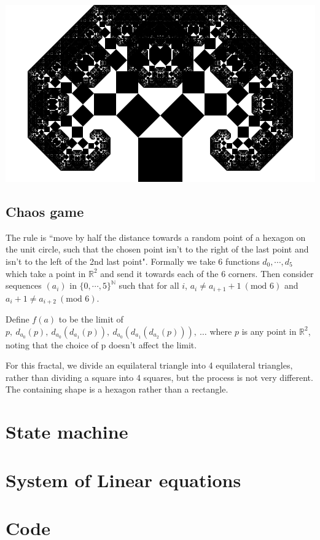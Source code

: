 \documentclass{article}
\newcommand{\bounding}{
\draw[tsty] (-2.5,1) -- (-1.5,0) -- (2.5,0) -- (3.5,1) -- (3.5,2.5) -- (2,4) -- (-1,4) -- (-2.5, 2.5) -- cycle;
}
\newcommand{\subt}[2]{
    \begin{scope}[yshift=1cm,rotate=45,scale=0.7071]
        #1
    \end{scope}
    \begin{scope}[xshift=0.5cm,yshift=1.5cm,rotate=-45,scale=0.7071]
        #2
    \end{scope}
}
\newcommand{\dup}[1]{\subt{#1}{#1}}
\newcommand{\gtree}[3]{
	#2
	\ifthenelse{#1<2}{
		#3
	}{
		\dup{\gtree{\the\numexpr#1-1}{#2}{#3}}
	}
}
\newcommand{\tree}[1]{
	\gtree{#1}{\fill[tsty] (0,0) -- (1,0) -- (1,1) -- (0,1) -- cycle;}{}
}
\newcommand{\outertree}[1]{
	\gtree{#1}{
		\fill[tsty] (0,0) -- (1,0) -- (1,1) -- (0,1) -- cycle;
	}{\bounding}
}
\newcommand{\depth}{5}%
\begin{document}
\includegraphics[width=\linewidth]{x7.png}

\label{sec:chaos}
\subsection{Chaos game}

The rule is ``move by half the distance towards a random point of a hexagon on the unit circle, such that the chosen point isn't to the right of the last point and isn't to the left of the 2nd last point". Formally we take 6 functions $d_0,\cdots, d_5$ which take a point in $\mathbb{R}^2$ and send it towards each of the 6 corners. Then consider sequences $(a_i)$ in $\{0,\cdots,5\}^\mathbb{N}$ such that for all $i$, $a_i\ne a_{i+1}+1\ (\textrm{mod }6)$ and $a_i+1\ne a_{i+2}\ (\textrm{mod }6)$. 

Define $f(a)$ to be the limit of $p,\ d_{a_0}(p),\ d_{a_0}(d_{a_1}(p)),\ d_{a_0}(d_{a_1}(d_{a_2}(p))),\ \dots$ where $p$ is any point in $\mathbb{R}^2$, noting that the choice of p doesn't affect the limit.

For this fractal, we divide an equilateral triangle into 4 equilateral triangles, rather than dividing a square into 4 squares, but the process is not very different. The containing shape is a hexagon rather than a rectangle. 

\appendix
\section{State machine}
\section{System of Linear equations}
\section{Code}



\end{document}
